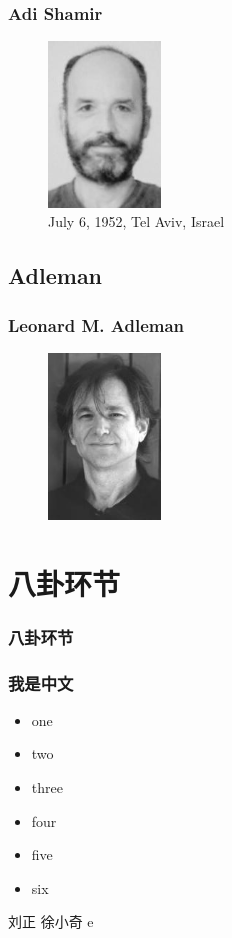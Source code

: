 \documentclass[slidestop,compress,mathserif]{beamer}
\begin{document}
\begin{frame}
  \frametitle{Adi Shamir}
  \begin{multicols}{2}
    \begin{minipage}[c]{0.5\textwidth}
      \begin{figure}[H]
        \includegraphics[width=3cm]{Shamir.jpg}
        \caption{July 6, 1952, Tel Aviv, Israel}
      \end{figure}
    \end{minipage}

  \end{multicols}
  
\end{frame}
\subsection{\hfill Adleman}
\begin{frame}
  \frametitle{Leonard M. Adleman}
  \begin{multicols}{2}
    \begin{figure}
      \includegraphics[width=3cm]{Adleman.jpg}
    \end{figure}
    
  \end{multicols}

\end{frame}





\section{八卦环节}
\begin{frame}
  \frametitle{八卦环节}

\end{frame}








\begin{frame}
\frametitle{我是中文} 
\begin{itemize}[<+->]
\item one
\item two
\item three
\item four
\item five
\item six
\end{itemize}

刘正 徐小奇 e
\end{frame}
\end{document}
